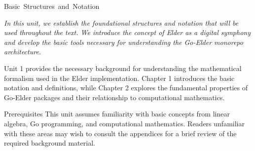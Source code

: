 
\unit{Basic Structures and Notation}

\begin{center}
\textit{In this unit, we establish the foundational structures and notation that will be used throughout the text. We introduce the concept of Elder as a digital symphony and develop the basic tools necessary for understanding the Go-Elder monorepo architecture.}
\end{center}

\vspace{1cm}

\begin{chaptersummary}
Unit 1 provides the necessary background for understanding the mathematical formalism used in the Elder implementation. Chapter 1 introduces the basic notation and definitions, while Chapter 2 explores the fundamental properties of Go-Elder packages and their relationship to computational mathematics.
\end{chaptersummary}

\vspace{1cm}

\begin{advancedtopic}{Prerequisites}
This unit assumes familiarity with basic concepts from linear algebra, Go programming, and computational mathematics. Readers unfamiliar with these areas may wish to consult the appendices for a brief review of the required background material.
\end{advancedtopic}
